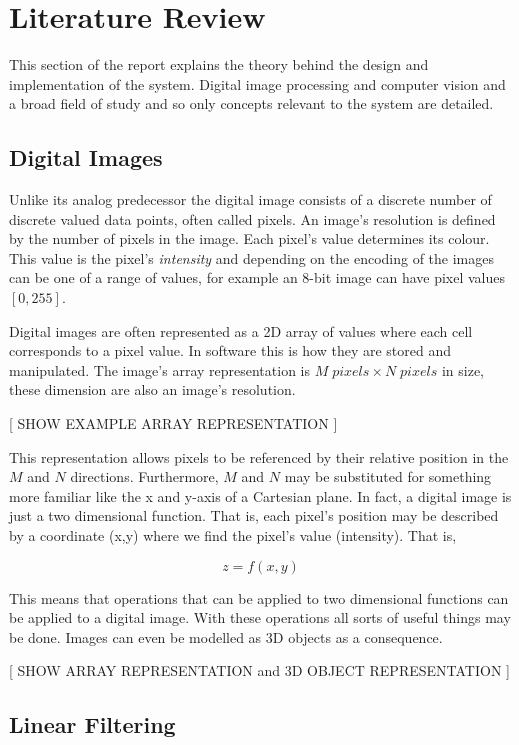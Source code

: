 \chapter{Literature Review}
This section of the report explains the theory behind the design and implementation of the system. Digital image processing and computer vision and a broad field of study and so only concepts relevant to the system are detailed.

\section{Digital Images}
Unlike its analog predecessor the digital image consists of a discrete number of discrete valued data points, often called pixels. An image's resolution is defined by the number of pixels in the image. Each pixel's value determines its colour. This value is the pixel's \emph{intensity} and depending on the encoding of the images can be one of a range of values, for example an 8-bit image can have pixel values $[0, 255]$. 

Digital images are often represented as a 2D array of values where each cell corresponds to a pixel value. In software this is how they are stored and manipulated. The image's array representation is $M\;pixels\times N\; pixels$ in size, these dimension are also an image's resolution.

[ SHOW EXAMPLE ARRAY REPRESENTATION ]

This representation allows pixels to be referenced by their relative position in the $M$ and $N$ directions. Furthermore, $M$ and $N$ may be substituted for something more familiar like the x and y-axis of a Cartesian plane. In fact, a digital image is just a two dimensional function. That is, each pixel's position may be described by a coordinate (x,y) where we find the pixel's value (intensity). That is, 

\[z = f(x,y)\]

This means that operations that can be applied to two dimensional functions can be applied to a digital image. With these operations all sorts of useful things may be done. Images can even be modelled as 3D objects as a consequence.

[ SHOW ARRAY REPRESENTATION and 3D OBJECT REPRESENTATION  ]




\section{Linear Filtering}

